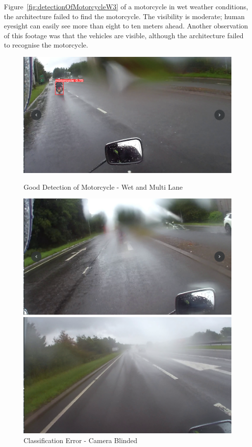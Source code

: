\documentclass[conference]{IEEEtran}
\begin{document}
	Figure~\ref{fig:detectionOfMotorcycleW3} of a motorcycle in wet weather conditions, the architecture failed to find the motorcycle. The visibility is moderate; human eyesight can easily see more than eight to ten meters ahead. Another observation of this footage was that the vehicles are visible, although the architecture failed to recognise the motorcycle.
	\begin{figure}[h]
		\centering
		\begin{minipage}{0.15\textwidth}
			\centering
			\includegraphics[width=\linewidth]{Figures/wet_correct.png}
			\caption{Good Detection of Motorcycle - Wet and Multi Lane}
			\label{fig:detectionOfMotorcycleW1}
		\end{minipage}\hfill
		\begin{minipage}{0.15\textwidth}
			\centering
			\includegraphics[width=\linewidth]{Figures/wet_incorrect.png}
			\caption{Classification Error - Camera Blinded}
			\label{fig:detectionOfMotorcycleW2}
		\end{minipage}\hfill
		\begin{minipage}{0.15\textwidth}
			\centering
			\includegraphics[width=\linewidth]{Figures/wet_danger.png}

\end{minipage}
\end{figure}
\end{document}
